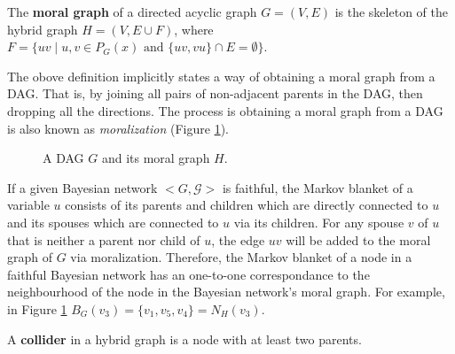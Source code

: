 \begin{definition}
\label{def:moral_g}
The \textbf{moral graph} of a directed acyclic graph $G=(V,E)$ is the skeleton of the hybrid graph $H=(V,E\cup F)$, where $F=\{uv \mid u,v \in P_G(x) \text{ and } \{uv,vu\} \cap E=\emptyset\}$.
\end{definition}
The obove definition implicitly states a way of obtaining a moral graph from a DAG. That is, by joining all pairs of non-adjacent parents in the DAG, then dropping all the directions. The process is obtaining a moral graph from a DAG is also known as \textit{moralization} (Figure \ref{fg:envelope}). 
\begin{figure}[H]
\centering
{}
\caption{A DAG $G$ and its moral graph $H$.}
\label{fg:envelope}
\end{figure}
If a given Bayesian network $<G,\mathcal{G}>$ is faithful, the Markov blanket of a variable $u$ consists of its parents and children which are directly connected to $u$ and its spouses which are connected to $u$ via its children. For any spouse $v$ of $u$ that is neither a parent nor child of $u$, the edge $uv$ will be added to the moral graph of $G$ via moralization. Therefore, the Markov blanket of a node in a faithful Bayesian network has an one-to-one correspondance to the neighbourhood of the node in the Bayesian network's moral graph. For example, in Figure \ref{fg:envelope} $B_G(v_3)=\{v_1,v_5,v_4\}=N_H(v_3)$.
\begin{definition}
\label{def:collider}
A \textbf{collider} in a hybrid graph is a node with at least two parents. 
\end{definition}

